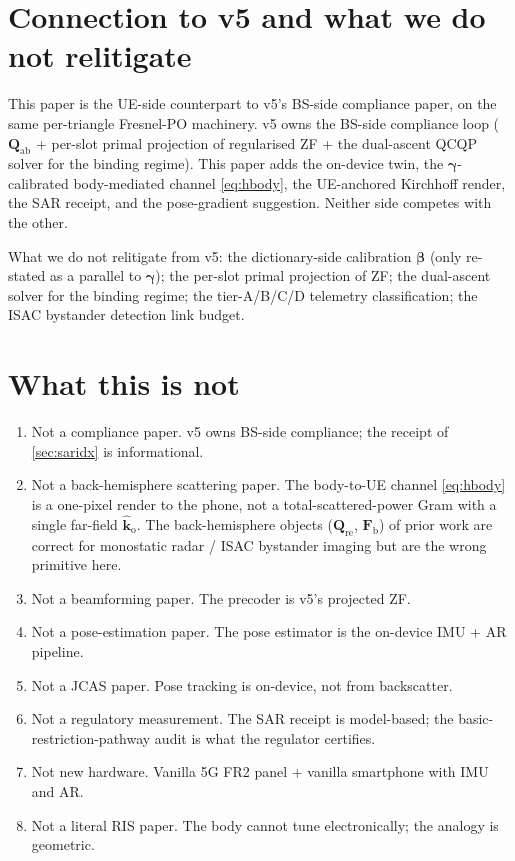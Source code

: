 \documentclass[11pt,a4paper]{article}
\theoremstyle{definition}
\newcommand{\Qabs}{\mathbf{Q}_{\mathrm{ab}}}
\newcommand{\Frib}{\mathbf{F}_{\mathrm{b}}}
\newcommand{\Qref}{\mathbf{Q}_{\mathrm{re}}}
\newcommand{\kout}{\hat{\bm{k}}_{\mathrm{o}}}
\begin{document}
\section{Connection to v5 and what we do not relitigate}\label{sec:v5}

This paper is the UE-side counterpart to v5's BS-side compliance
paper, on the same per-triangle Fresnel-PO machinery.  v5 owns the
BS-side compliance loop ($\Qabs$ + per-slot primal projection of
regularised ZF + the dual-ascent QCQP solver for the binding
regime).  This paper adds the on-device twin, the
$\bm\gamma$-calibrated body-mediated channel
\cref{eq:hbody}, the UE-anchored Kirchhoff render, the SAR
receipt, and the pose-gradient suggestion.  Neither side competes
with the other.

What we do not relitigate from v5: the dictionary-side calibration
$\bm\beta$ (only re-stated as a parallel to $\bm\gamma$); the
per-slot primal projection of ZF; the dual-ascent solver for the
binding regime; the tier-A/B/C/D telemetry classification; the ISAC
bystander detection link budget.

\section{What this is not}\label{sec:notthis}

\begin{enumerate}[leftmargin=1.6em,itemsep=3pt]
\item Not a compliance paper.  v5 owns BS-side compliance; the
receipt of \cref{sec:saridx} is informational.
\item Not a back-hemisphere scattering paper.  The body-to-UE
channel \cref{eq:hbody} is a one-pixel render to the phone, not a
total-scattered-power Gram with a single far-field $\kout$.  The
back-hemisphere objects ($\Qref$, $\Frib$) of prior work are
correct for monostatic radar / ISAC bystander imaging but are the
wrong primitive here.
\item Not a beamforming paper.  The precoder is v5's projected ZF.
\item Not a pose-estimation paper.  The pose estimator is the
on-device IMU + AR pipeline.
\item Not a JCAS paper.  Pose tracking is on-device, not from
backscatter.
\item Not a regulatory measurement.  The SAR receipt is
model-based; the basic-restriction-pathway audit is what the
regulator certifies.
\item Not new hardware.  Vanilla 5G FR2 panel + vanilla smartphone
with IMU and AR.
\item Not a literal RIS paper.  The body cannot tune
electronically; the analogy is geometric.
\end{enumerate}
\end{document}
